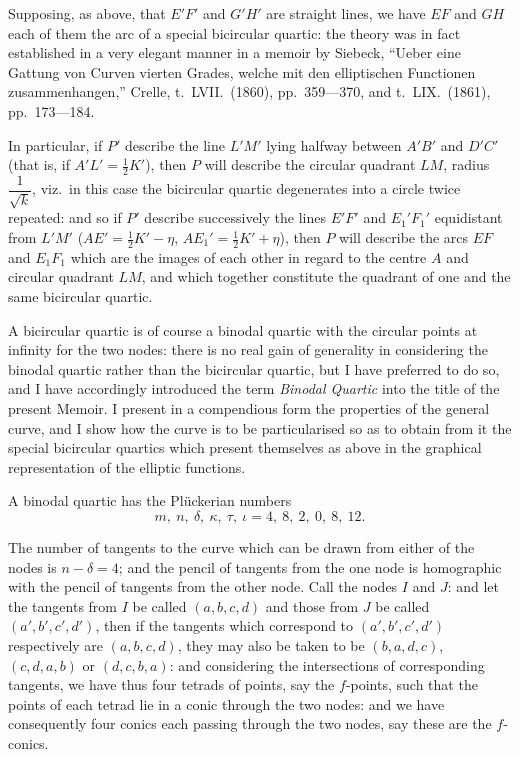 \documentclass[11pt,a4paper]{article}
\begin{document}
Supposing, as above, that $E'F'$ and $G'H'$ are straight lines, we have $EF$ and $GH$ each of them the arc of a special bicircular quartic: the theory was in fact established in a very elegant manner in a memoir by Siebeck, ``Ueber eine Gattung von Curven vierten Grades, welche mit den elliptischen Functionen zusammenhangen,'' Crelle, t.\ LVII.\ (1860), pp.\ 359---370, and t.\ LIX.\ (1861), pp.\ 173---184.

In particular, if $P'$ describe the line $L'M'$ lying halfway between $A'B'$ and $D'C'$ (that is, if $A'L' = \tfrac{1}{2}K'$), then $P$ will describe the circular quadrant $LM$, radius $\dfrac{1}{\sqrt{k}}$, viz.\ in this case the bicircular quartic degenerates into a circle twice repeated: and so if $P'$ describe successively the lines $E'F'$ and $E_1'F_1'$ equidistant from $L'M'$ ($AE' = \tfrac{1}{2}K' - \eta$, $AE_1' = \tfrac{1}{2}K' + \eta$), then $P$ will describe the arcs $EF$ and $E_1F_1$ which are the images of each other in regard to the centre $A$ and circular quadrant $LM$, and which together constitute the quadrant of one and the same bicircular quartic.

A bicircular quartic is of course a binodal quartic with the circular points at infinity for the two nodes: there is no real gain of generality in considering the binodal quartic rather than the bicircular quartic, but I have preferred to do so, and I have accordingly introduced the term \emph{Binodal Quartic} into the title of the present Memoir. I present in a compendious form the properties of the general curve, and I show how the curve is to be particularised so as to obtain from it the special bicircular quartics which present themselves as above in the graphical representation of the elliptic functions.

A binodal quartic has the Pl\"uckerian numbers
\[
m,\ n,\ \delta,\ \kappa,\ \tau,\ \iota = 4,\ 8,\ 2,\ 0,\ 8,\ 12.
\]

The number of tangents to the curve which can be drawn from either of the nodes is $n - \delta = 4$; and the pencil of tangents from the one node is homographic with the pencil of tangents from the other node. Call the nodes $I$ and $J$: and let the tangents from $I$ be called $(a, b, c, d)$ and those from $J$ be called $(a', b', c', d')$, then if the tangents which correspond to $(a', b', c', d')$ respectively are $(a, b, c, d)$, they may also be taken to be $(b, a, d, c)$, $(c, d, a, b)$ or $(d, c, b, a)$: and considering the intersections of corresponding tangents, we have thus four tetrads of points, say the $f$-points, such that the points of each tetrad lie in a conic through the two nodes: and we have consequently four conics each passing through the two nodes, say these are the $f$-conics.
\end{document}
